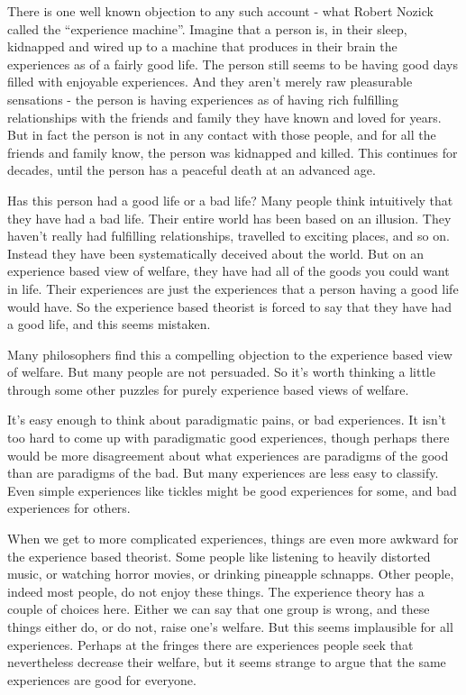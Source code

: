 There is one well known objection to any such account - what Robert Nozick called the ``experience machine''. Imagine that a person is, in their sleep, kidnapped and wired up to a machine that produces in their brain the experiences as of a fairly good life. The person still seems to be having good days filled with enjoyable experiences. And they aren't merely raw pleasurable sensations - the person is having experiences as of having rich fulfilling relationships with the friends and family they have known and loved for years. But in fact the person is not in any contact with those people, and for all the friends and family know, the person was kidnapped and killed. This continues for decades, until the person has a peaceful death at an advanced age.

Has this person had a good life or a bad life? Many people think intuitively that they have had a bad life. Their entire world has been based on an illusion. They haven't really had fulfilling relationships, travelled to exciting places, and so on. Instead they have been systematically deceived about the world. But on an experience based view of welfare, they have had all of the goods you could want in life. Their experiences are just the experiences that a person having a good life would have. So the experience based theorist is forced to say that they have had a good life, and this seems mistaken.

Many philosophers find this a compelling objection to the experience based view of welfare. But many people are not persuaded. So it's worth thinking a little through some other puzzles for purely experience based views of welfare.

It's easy enough to think about paradigmatic pains, or bad experiences. It isn't too hard to come up with paradigmatic good experiences, though perhaps there would be more disagreement about what experiences are paradigms of the good than are paradigms of the bad. But many experiences are less easy to classify. Even simple experiences like tickles might be good experiences for some, and bad experiences for others.

When we get to more complicated experiences, things are even more awkward for the experience based theorist. Some people like listening to heavily distorted music, or watching horror movies, or drinking pineapple schnapps. Other people, indeed most people, do not enjoy these things. The experience theory has a couple of choices here. Either we can say that one group is wrong, and these things either do, or do not, raise one's welfare. But this seems implausible for all experiences. Perhaps at the fringes there are experiences people seek that nevertheless decrease their welfare, but it seems strange to argue that the same experiences are good for everyone. 

